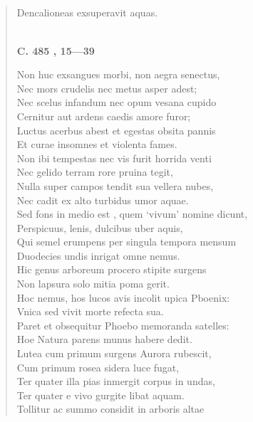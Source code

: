 \documentclass[11pt, a4paper]{report}
\begin{document}
            \subsection*{}
      \begin{verse}
      Dencalioneas exsuperavit aquas. \\ 
        ﻿\pagebreak 
    \begin{center} \textbf{C. 485 , 15—39} \end{center} \marginpar{[21]} Non huc exsangues morbi, non aegra senectus, \\ Nec mors crudelis nec metus asper adest; \\ Nec scelus infandum nec opum vesana cupido \\ Cernitur aut ardens caedis amore furor; \\ Luctus acerbus abest et egestas obsita pannis \\ Et curae insomnes et violenta fames. \\ Non ibi tempestas nec vis furit horrida venti \\ Nec gelido terram rore pruina tegit, \\ Nulla super campos tendit sua vellera nubes, \\ Nec cadit ex alto turbidus umor aquae. \\ Sed fons in medio  \lbrack est \rbrack , quem ‘vivum’ nomine dicunt, \\ Perspicuus, lenis, dulcibus uber aquis, \\ Qui semel erumpens per singula tempora mensum \\ Duodecies undis inrigat omne nemus. \\ Hic genus arboreum procero stipite surgens \\ Non lapsura solo mitia poma gerit. \\ Hoc nemus, hos lucos avis incolit upica Pboenix: \\ Vnica sed vivit morte refecta sua. \\ Paret et obsequitur Phoebo memoranda satelles: \\ Hoe Natura parens munus habere dedit. \\ Lutea cum primum surgens Aurora rubescit, \\ Cum primum rosea sidera luce fugat, \\ Ter quater illa pias inmergit corpus in undas, \\ Ter quater e vivo gurgite libat aquam. \\ Tollitur ac summo considit in arboris altae \\ 

\end{verse}
\end{document}
